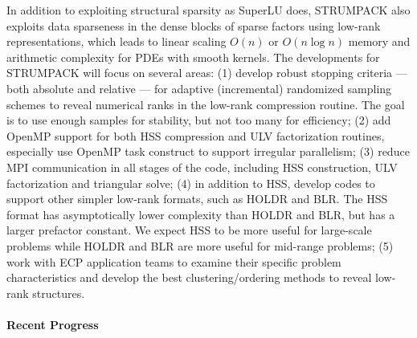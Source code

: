 In addition to exploiting structural sparsity as SuperLU does, STRUMPACK
also exploits data sparseness in the dense blocks of sparse factors using
low-rank representations, which leads to linear scaling $O(n)$ or $O(n \log n)$
memory and arithmetic complexity for PDEs with smooth kernels.
The developments for STRUMPACK will focus on several areas:
(1) develop robust stopping criteria --- both absolute and relative --- for
    adaptive (incremental) randomized sampling schemes to reveal numerical
    ranks in the low-rank compression routine. The goal is to use
    enough samples for stability, but not too many for efficiency;
(2) add OpenMP support for both HSS compression and ULV factorization routines,
    especially use OpenMP task construct to support irregular parallelism;
(3) reduce MPI communication in all stages of the code, including HSS
    construction, ULV factorization and triangular solve;
(4) in addition to HSS, develop codes to support other simpler low-rank
    formats, such as HOLDR and BLR. The HSS format has asymptotically
    lower complexity than HOLDR and BLR, but has a larger prefactor constant.
    We expect HSS to be more useful for large-scale problems while HOLDR
    and BLR are more useful for mid-range problems;
(5) work with ECP application teams to examine their specific problem
    characteristics and develop the best clustering/ordering methods to 
    reveal low-rank structures.
    
\vspace{-10pt}
\paragraph{Recent Progress}


